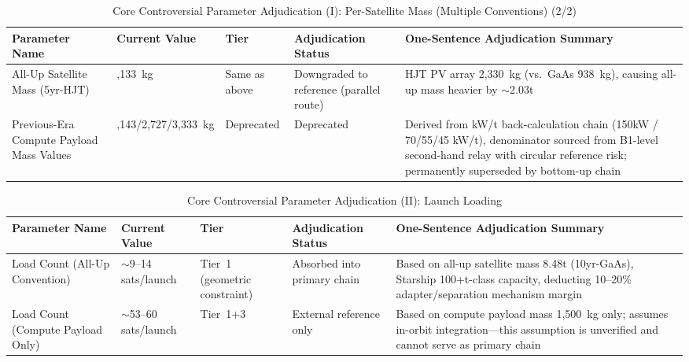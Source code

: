 \begin{table}[H]
  \centering
  \caption{Core Controversial Parameter Adjudication (I): Per-Satellite Mass (Multiple Conventions) (2/2)}
  \label{tab:core-verdicts-mass-2}
  \footnotesize
  \begin{tabularx}{\textwidth}{
    >{\raggedright\arraybackslash}p{2.7cm}
    >{\raggedright\arraybackslash}p{2.2cm}
    >{\centering\arraybackslash}p{1.5cm}
    >{\raggedright\arraybackslash}p{2.1cm}
    >{\raggedright\arraybackslash}X
  }
  \toprule
  \textbf{Parameter Name} & \textbf{Current Value} & \textbf{Tier} & \textbf{Adjudication Status} & \textbf{One-Sentence Adjudication Summary} \\
  \midrule
  All-Up Satellite Mass (5yr-HJT) & 9,133~kg & Same as above & Downgraded to reference (parallel route) & HJT PV array 2,330~kg (vs.\ GaAs 938~kg), causing all-up mass heavier by $\sim$2.03t \\
  Previous-Era Compute Payload Mass Values & 2,143/2,727/3,333~kg & Deprecated & Deprecated & Derived from kW/t back-calculation chain (150kW / 70/55/45 kW/t), denominator sourced from B1-level second-hand relay with circular reference risk; permanently superseded by bottom-up chain \\
  \bottomrule
  \end{tabularx}
\end{table}

\begin{table}[H]
  \centering
  \caption{Core Controversial Parameter Adjudication (II): Launch Loading}
  \label{tab:core-verdicts-launch}
  \small
  \begin{tabularx}{\textwidth}{
    >{\raggedright\arraybackslash}p{2.7cm}
    >{\raggedright\arraybackslash}p{2.2cm}
    >{\centering\arraybackslash}p{1.5cm}
    >{\raggedright\arraybackslash}p{2.1cm}
    >{\raggedright\arraybackslash}X
  }
  \toprule
  \textbf{Parameter Name} & \textbf{Current Value} & \textbf{Tier} & \textbf{Adjudication Status} & \textbf{One-Sentence Adjudication Summary} \\
  \midrule
  Load Count (All-Up Convention) & $\sim$9--14 sats/launch & Tier~1 (geometric constraint) & Absorbed into primary chain & Based on all-up satellite mass 8.48t (10yr-GaAs), Starship 100+t-class capacity, deducting 10--20\% adapter/separation mechanism margin \\
  Load Count (Compute Payload Only) & $\sim$53--60 sats/launch & Tier~1+3 & External reference only & Based on compute payload mass 1,500~kg only; assumes in-orbit integration---this assumption is unverified and cannot serve as primary chain \\
  \bottomrule
  \end{tabularx}
\end{table}

